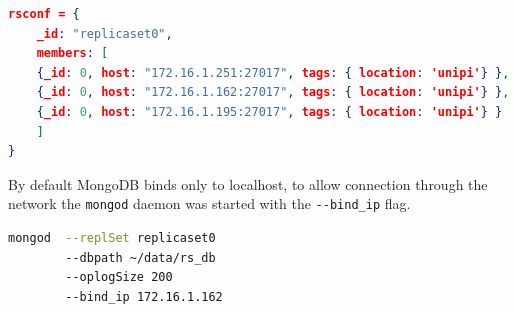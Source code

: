 \documentclass[11pt]{article}
\begin{document}
\begin{lstlisting}[language=json]	
rsconf = {
	_id: "replicaset0",
	members: [
	{_id: 0, host: "172.16.1.251:27017", tags: { location: 'unipi'} },
	{_id: 0, host: "172.16.1.162:27017", tags: { location: 'unipi'} },
	{_id: 0, host: "172.16.1.195:27017", tags: { location: 'unipi'} }
	]
}
\end{lstlisting}

By default MongoDB binds only to localhost, to allow connection through the network the \lstinline{mongod} daemon was started with the \lstinline{--bind_ip} flag.

\begin{lstlisting}[language=bash]
mongod 	--replSet replicaset0
		--dbpath ~/data/rs_db
		--oplogSize 200 
		--bind_ip 172.16.1.162
\end{lstlisting}
\end{document}
